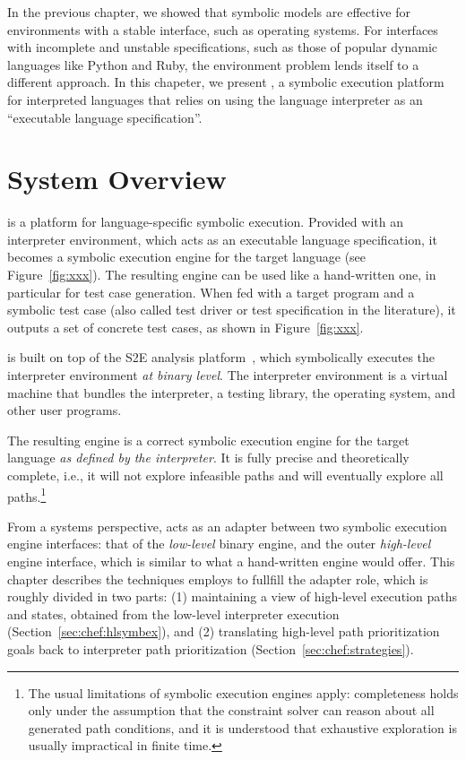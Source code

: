 In the previous chapter, we showed that symbolic models are effective for environments with a stable interface, such as operating systems.
%
For interfaces with incomplete and unstable specifications, such as those of popular dynamic languages like Python and Ruby, the environment problem lends itself to a different approach.
%
In this chapeter, we present \chef, a symbolic execution platform for interpreted languages that relies on using the language interpreter as an ``executable language specification''.

\section{System Overview}

\chef is a platform for language-specific symbolic execution.  Provided with an interpreter environment, which acts as an executable language specification, it becomes a symbolic execution engine for the target language (see Figure~\ref{fig:xxx}).
%
The resulting engine can be used like a hand-written one, in particular for test case generation.  When fed with a target program and a symbolic test case (also called test driver or test specification in the literature), it outputs a set of concrete test cases, as shown in Figure~\ref{fig:xxx}.

\chef is built on top of the S2E analysis platform~\cite{s2eSystem}, which symbolically executes the interpreter environment \emph{at binary level}.  The interpreter environment is a virtual machine that bundles the interpreter, a testing library, the operating system, and other user programs.

The resulting engine is a correct symbolic execution engine for the target language \emph{as defined by the interpreter}.  It is fully precise and theoretically complete, i.e., it will not explore infeasible paths and will eventually explore all paths.\footnote{The usual limitations of symbolic execution engines apply: completeness holds only under the assumption that the constraint solver can reason about all generated path conditions, and it is understood that exhaustive exploration is usually impractical in finite time.}

From a systems perspective, \chef acts as an adapter between two symbolic execution engine interfaces: that of the \emph{low-level} binary engine, and the outer \emph{high-level} engine interface, which is similar to what a hand-written engine would offer.
%
This chapter describes the techniques \chef employs to fullfill the adapter role, which is roughly divided in two parts: (1) maintaining a view of high-level execution paths and states, obtained from the low-level interpreter execution (Section~\ref{sec:chef:hlsymbex}), and (2) translating high-level path prioritization goals back to interpreter path prioritization (Section~\ref{sec:chef:strategies}).

